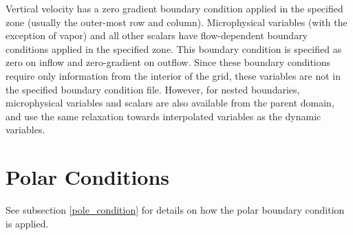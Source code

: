 Vertical velocity has a zero gradient boundary condition applied in the
specified zone (usually the outer-most row and column).
Microphysical variables (with the exception of vapor) and all other scalars have flow-dependent boundary
conditions applied in the specified zone. This boundary condition is specified as zero on inflow
and zero-gradient on outflow. Since these boundary conditions require only information from
the interior of the grid, these variables are not in the specified boundary condition file.
However, for nested boundaries, microphysical variables and scalars are also available
from the parent domain, and use the same relaxation towards interpolated variables as the
dynamic variables.

\section{Polar Conditions}
See subsection \ref{pole_condition} for details on how the polar boundary
condition is applied.

